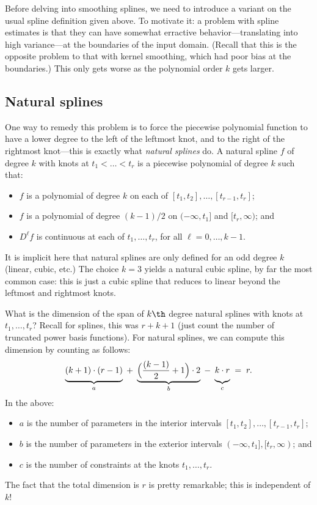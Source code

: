 \documentclass{article}
\begin{document}
Before delving into smoothing splines, we need to introduce a variant on the
usual spline definition given above. To motivate it: a problem with spline
estimates is that they can have somewhat erractive behavior---translating into
high variance---at the boundaries of the input domain. (Recall that this is the
opposite problem to that with kernel smoothing, which had poor bias at the
boundaries.) This only gets worse as the polynomial order $k$ gets larger.   

\subsection{Natural splines}

One way to remedy this problem is to force the piecewise polynomial function to
have a lower degree to the left of the leftmost knot, and to the right of the
rightmost knot---this is exactly what \emph{natural splines} do. A natural
spline $f$ of degree $k$ with knots at $t_1 < \dots < t_r$ is a piecewise
polynomial of degree $k$ such that:
\begin{itemize}
\item $f$ is a polynomial of degree $k$ on each of $[t_1,t_2], \dots,
  [t_{r-1},t_r]$; 
\item $f$ is a polynomial of degree $(k-1)/2$ on $(-\infty,t_1]$ and
  $[t_r,\infty)$; and 
\item $D^\ell f$ is continuous at each of $t_1,\dots,t_r$, for all
  $\ell=0,\dots,k-1$. 
\end{itemize}
It is implicit here that natural splines are only defined for an odd degree $k$
(linear, cubic, etc.) The choice $k=3$ yields a natural cubic spline, by far the
most common case: this is just a cubic spline that reduces to linear beyond the 
leftmost and rightmost knots.     

What is the dimension of the span of $k\th$ degree natural splines with knots at
$t_1,\dots,t_r$? Recall for splines, this was $r+k+1$ (just count the number of
truncated power basis functions). For natural splines, we can compute this
dimension by counting as follows:  
\[
\underbrace{\vphantom{\Big(\Big)} (k+1)\cdot(r-1)}_{a} \;+\; 
\underbrace{\Big(\frac{(k-1)}{2}+1\Big) \cdot 2}_{b} \;-\;
\underbrace{\vphantom{\Big(\Big)} k \cdot r}_{c} \;=\; r. 
\]
In the above: 
\begin{itemize}
\item $a$ is the number of parameters in the interior intervals $[t_1,t_2],
  \dots, [t_{r-1},t_r]$; 
\item $b$ is the number of parameters in the exterior intervals $(-\infty,t_1],
  [t_r,\infty)$; and 
\item $c$ is the number of constraints at the knots $t_1,\dots,t_r$.  
\end{itemize}
The fact that the total dimension is $r$ is pretty remarkable; this is
independent of $k$!   
\end{document}
